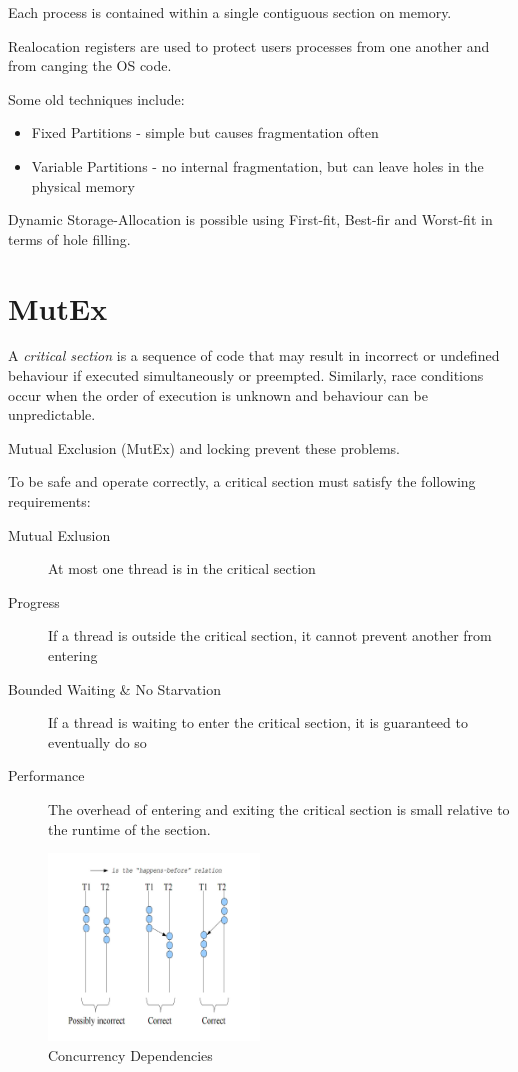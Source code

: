 \documentclass{article}
\begin{document}
Each process is contained within a single contiguous section on memory.

Realocation registers are used to protect users processes from one another and from canging the OS code.

Some old techniques include:
\begin{itemize}
    \item Fixed Partitions - simple but causes fragmentation often
    \item Variable Partitions - no internal fragmentation, but can leave holes in the physical memory
\end{itemize}

Dynamic Storage-Allocation is possible using First-fit, Best-fir and Worst-fit in terms of hole filling.




\filbreak
\section{MutEx}\label{mutex}

A \emph{critical section} is a sequence of code that may result in
incorrect or undefined behaviour if executed simultaneously or
preempted. Similarly, race conditions occur when the order of execution
is unknown and behaviour can be unpredictable.

Mutual Exclusion (MutEx) and locking prevent these problems.

To be safe and operate correctly, a critical section must satisfy the
following requirements:

\begin{description}
\item[Mutual Exlusion]
At most one thread is in the critical section
\item[Progress]
If a thread is outside the critical section, it cannot prevent another
from entering
\item[Bounded Waiting \& No Starvation]
If a thread is waiting to enter the critical section, it is guaranteed
to eventually do so
\item[Performance]
The overhead of entering and exiting the critical section is small
relative to the runtime of the section.
\end{description}

\begin{figure}[h!]
  \centering
  \includegraphics[width=0.5\textwidth]{correctConcurrency}
  \caption{Concurrency Dependencies}
\end{figure}
\end{document}
